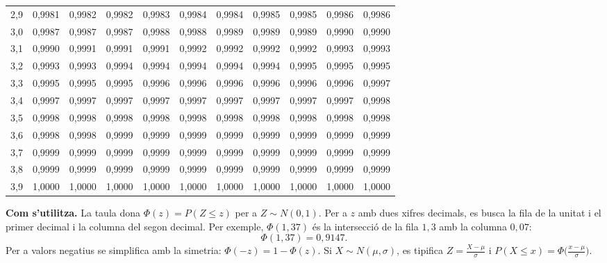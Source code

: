 \begin{center}
\begin{tabular}{@{}r|cccccccccc@{}}
2{,}9 & 0{,}9981 & 0{,}9982 & 0{,}9982 & 0{,}9983 & 0{,}9984 & 0{,}9984 & 0{,}9985 & 0{,}9985 & 0{,}9986 & 0{,}9986 \\
3{,}0 & 0{,}9987 & 0{,}9987 & 0{,}9987 & 0{,}9988 & 0{,}9988 & 0{,}9989 & 0{,}9989 & 0{,}9989 & 0{,}9990 & 0{,}9990 \\
3{,}1 & 0{,}9990 & 0{,}9991 & 0{,}9991 & 0{,}9991 & 0{,}9992 & 0{,}9992 & 0{,}9992 & 0{,}9992 & 0{,}9993 & 0{,}9993 \\
3{,}2 & 0{,}9993 & 0{,}9993 & 0{,}9994 & 0{,}9994 & 0{,}9994 & 0{,}9994 & 0{,}9994 & 0{,}9995 & 0{,}9995 & 0{,}9995 \\
3{,}3 & 0{,}9995 & 0{,}9995 & 0{,}9995 & 0{,}9996 & 0{,}9996 & 0{,}9996 & 0{,}9996 & 0{,}9996 & 0{,}9996 & 0{,}9997 \\
3{,}4 & 0{,}9997 & 0{,}9997 & 0{,}9997 & 0{,}9997 & 0{,}9997 & 0{,}9997 & 0{,}9997 & 0{,}9997 & 0{,}9997 & 0{,}9998 \\
3{,}5 & 0{,}9998 & 0{,}9998 & 0{,}9998 & 0{,}9998 & 0{,}9998 & 0{,}9998 & 0{,}9998 & 0{,}9998 & 0{,}9998 & 0{,}9998 \\
3{,}6 & 0{,}9998 & 0{,}9998 & 0{,}9999 & 0{,}9999 & 0{,}9999 & 0{,}9999 & 0{,}9999 & 0{,}9999 & 0{,}9999 & 0{,}9999 \\
3{,}7 & 0{,}9999 & 0{,}9999 & 0{,}9999 & 0{,}9999 & 0{,}9999 & 0{,}9999 & 0{,}9999 & 0{,}9999 & 0{,}9999 & 0{,}9999 \\
3{,}8 & 0{,}9999 & 0{,}9999 & 0{,}9999 & 0{,}9999 & 0{,}9999 & 0{,}9999 & 0{,}9999 & 0{,}9999 & 0{,}9999 & 0{,}9999 \\
3{,}9 & 1{,}0000 & 1{,}0000 & 1{,}0000 & 1{,}0000 & 1{,}0000 & 1{,}0000 & 1{,}0000 & 1{,}0000 & 1{,}0000 & 1{,}0000 \\
\bottomrule
\end{tabular}
\end{center}
\normalsize\vspace{0.4em}
\begin{minipage}[t]{0.52\linewidth}
\textbf{Com s'utilitza.} La taula dona $\Phi(z)=P(Z\le z)$ per a $Z\sim N(0,1)$. Per a $z$ amb dues xifres decimals, es busca la fila de la unitat i el primer decimal i la columna del segon decimal. Per exemple, $\Phi(1{,}37)$ és la intersecció de la fila $1{,}3$ amb la columna $0{,}07$:
\[\Phi(1{,}37)=0{,}9147.\]
Per a valors negatius se simplifica amb la simetria: $\Phi(-z)=1-\Phi(z)$. Si $X\sim N(\mu,\sigma)$, es tipifica $Z=\frac{X-\mu}{\sigma}$ i $P(X\le x)=\Phi\bigl(\frac{x-\mu}{\sigma}\bigr)$.
\end{minipage}\hfill
